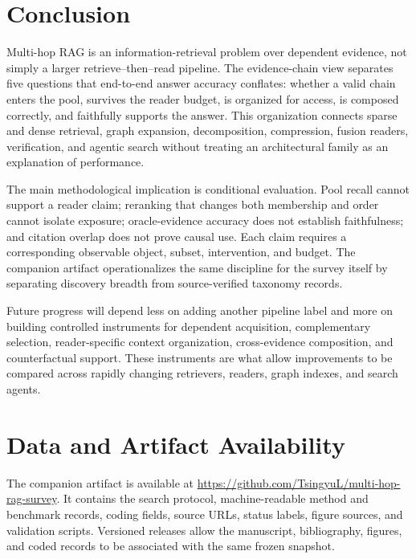 \documentclass[manuscript,review]{acmart}
\theoremstyle{definition}
\theoremstyle{plain}
\theoremstyle{remark}
\begin{document}
\section{Conclusion}
\label{sec:conclusion}

Multi-hop RAG is an information-retrieval problem over dependent evidence,
not simply a larger retrieve--then--read pipeline. The evidence-chain view
separates five questions that end-to-end answer accuracy conflates: whether a
valid chain enters the pool, survives the reader budget, is organized for
access, is composed correctly, and faithfully supports the answer. This
organization connects sparse and dense retrieval, graph expansion,
decomposition, compression, fusion readers, verification, and agentic search
without treating an architectural family as an explanation of performance.

The main methodological implication is conditional evaluation. Pool recall
cannot support a reader claim; reranking that changes both membership and
order cannot isolate exposure; oracle-evidence accuracy does not establish
faithfulness; and citation overlap does not prove causal use. Each claim
requires a corresponding observable object, subset, intervention, and budget.
The companion artifact operationalizes the same discipline for the survey
itself by separating discovery breadth from source-verified taxonomy records.

Future progress will depend less on adding another pipeline label and more on
building controlled instruments for dependent acquisition, complementary
selection, reader-specific context organization, cross-evidence composition,
and counterfactual support. These instruments are what allow improvements to
be compared across rapidly changing retrievers, readers, graph indexes, and
search agents.

\section*{Data and Artifact Availability}

The companion artifact is available at
\url{https://github.com/TsingyuL/multi-hop-rag-survey}. It contains the search
protocol, machine-readable method and benchmark records, coding fields,
source URLs, status labels, figure sources, and validation scripts. Versioned
releases allow the manuscript, bibliography, figures, and coded records to be
associated with the same frozen snapshot.

\appendix
\end{document}
